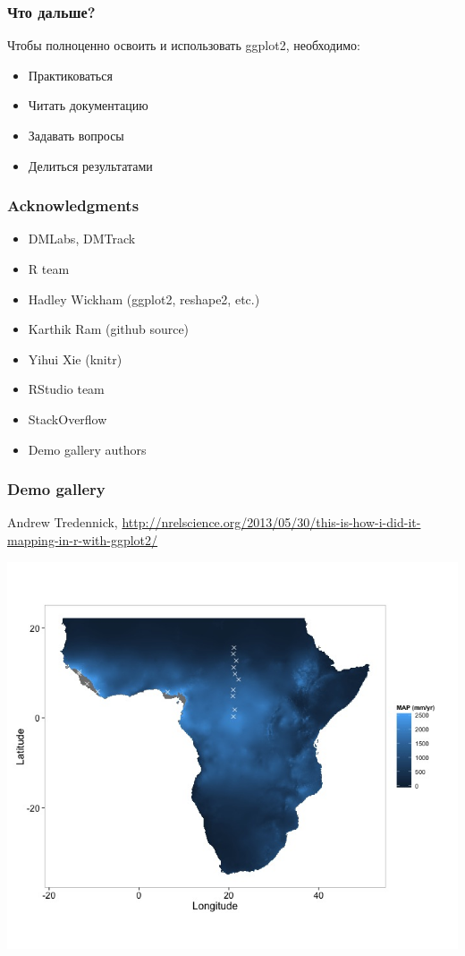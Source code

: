 \documentclass[compress]{beamer}\usepackage[]{graphicx}\usepackage[]{color}
\begin{document}
\begin{frame}[fragile]
\frametitle{Что дальше?}
Чтобы полноценно освоить и использовать ggplot2, необходимо: 
\begin{itemize}
\item Практиковаться
\item Читать документацию
\item Задавать вопросы
\item Делиться результатами
\end{itemize}
\end{frame}

\begin{frame}[fragile]
\frametitle{Acknowledgments}
\begin{itemize}
\item DMLabs, DMTrack
\item R team
\item Hadley Wickham (ggplot2, reshape2, etc.)
\item Karthik Ram (github source)
\item Yihui Xie (knitr)
\item RStudio team
\item StackOverflow
\item Demo gallery authors
\end{itemize}
\end{frame}

\begin{frame}[fragile]
\frametitle{Demo gallery}
Andrew Tredennick, \footnotesize{\url{http://nrelscience.org/2013/05/30/this-is-how-i-did-it-mapping-in-r-with-ggplot2/}}
\begin{center}
  \includegraphics[height=.6\textheight]{images/cool1.jpeg}
\end{center}
\end{frame}
\end{document}
